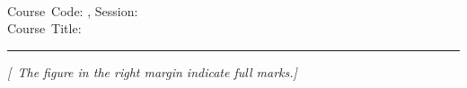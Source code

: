 
\begin{center}
	\Large{\institutionName{}}\\
	\large{\deptName{}}\\
	\examName{}\\
	Course~Code: \courseCode{}, Session: \SessionExaminee\\
	Course~Title: \courseTitle{}\\
	
	
	
\end{center}

\vspace{1mm}
\noindent
{}

\vspace{-2.0mm}
\noindent\rule{\textwidth}{2pt}

\begin{center}
\vspace{-2.0mm}
\textit{[\specialInstruction{}~The figure in the right margin indicate full marks.]}
\end{center}
